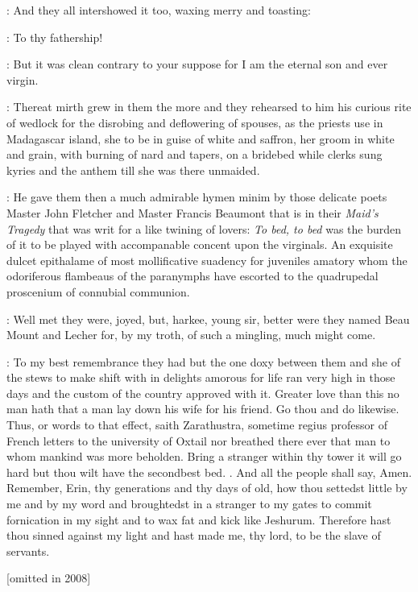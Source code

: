 :
And they all intershowed it too,
waxing merry and toasting:

\All:
To thy fathership!

\stephen:
But it was clean contrary to your suppose for I am the
eternal son and ever virgin.

:
Thereat mirth grew in them the more and they
rehearsed to him his curious rite of wedlock for the disrobing and
deflowering of spouses,
as the priests use in Madagascar island,
she to
be in guise of white and saffron,
her groom in white and grain,
with
burning of nard and tapers,
on a bridebed while clerks sung kyries and
the anthem 
till she was there unmaided.

:
He gave them then a much admirable hymen minim by those
delicate poets Master John Fletcher and Master Francis Beaumont that is
in their \emph{Maid's Tragedy} that was writ for a like twining of lovers:
\emph{To bed,
to bed} was the burden of it to be played with
accompanable concent upon the virginals.
An exquisite dulcet epithalame of most mollificative suadency for
juveniles amatory whom the odoriferous flambeaus of the paranymphs have
escorted to the quadrupedal proscenium of connubial communion.

\dixon:
Well met they were,
joyed,
but,
harkee,
young sir,
better were they named Beau Mount and Lecher for,
by my troth,
of such a mingling,
much might come.

\stephen:
To my best remembrance they had but the one doxy between them and she
of the stews to make shift with in delights amorous for life ran very high
in those days and the custom of the country approved with it.
Greater love
than this no man hath that a man lay down his wife for his friend.
Go thou
and do likewise.
Thus,
or words to that effect,
saith Zarathustra,
sometime regius professor of French letters to the university of Oxtail
nor breathed there ever that man to whom mankind was more beholden.
Bring
a stranger within thy tower it will go hard but thou wilt have the
secondbest bed.
.
And all the people
shall say,
Amen.
Remember,
Erin,
thy generations and thy days of old,
how
thou settedst little by me and by my word and broughtedst in a stranger to
my gates to commit fornication in my sight and to wax fat and kick like
Jeshurum.
Therefore hast thou sinned against my light and hast made me,
thy lord,
to be the slave of servants.

[omitted in 2008]

